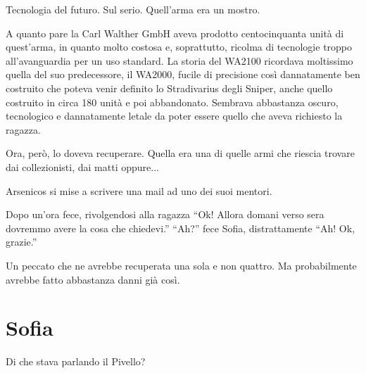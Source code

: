     Tecnologia del futuro. Sul serio. Quell'arma era un mostro.

    A quanto pare la Carl Walther GmbH aveva prodotto centocinquanta unità di quest'arma, in quanto molto costosa e,
    soprattutto, ricolma di tecnologie troppo all'avanguardia per un uso standard. La storia del WA2100 ricordava
    moltissimo quella del suo predecessore, il WA2000, fucile di precisione così dannatamente ben costruito che poteva
    venir definito lo Stradivarius degli Sniper, anche quello costruito in circa 180 unità e poi abbandonato. Sembrava
    abbastanza oscuro, tecnologico e dannatamente letale da poter essere quello che aveva richiesto la ragazza.

    Ora, però, lo doveva recuperare. Quella era una di quelle armi che riescia trovare dai collezionisti, dai matti
    oppure...

    Arsenicos si mise a scrivere una mail ad uno dei suoi mentori.

    Dopo un'ora fece, rivolgendosi alla ragazza ``Ok! Allora domani verso sera dovremmo avere la cosa che chiedevi.''
    ``Ah?'' fece Sofia, distrattamente ``Ah! Ok, grazie.''

    Un peccato che ne avrebbe recuperata una sola e non quattro. Ma probabilmente avrebbe fatto abbastanza danni già
    così.

  \section*{Sofia}

    Di che stava parlando il Pivello?
